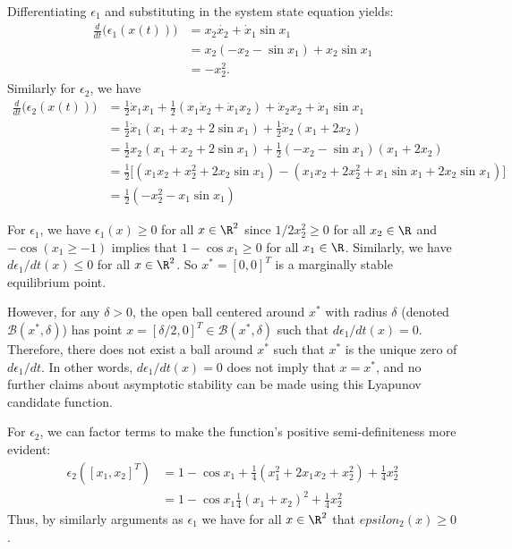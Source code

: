 \documentclass{homework}
\begin{document}
\begin{letterenum}
\item 
Differentiating $\epsilon_1$ and substituting in the system state equation yields:
\begin{align*}
    \frac{d}{dt} \biggl(\epsilon_1(x(t))\biggr)
        &= x_2 \dot{x_2} + \dot{x}_1 \sin x_1 \\
        &= x_2 ( -x_2 - \sin x_1) + x_2 \sin x_1 \\
        &= -x_2^2.
\end{align*}
Similarly for $\epsilon_2$, we have
\begin{align*}
    \frac{d}{dt} \biggl(\epsilon_2(x(t))\biggr)
        &= \frac{1}{2} \dot{x}_1 x_1 + \frac{1}{2} (x_1 \dot{x}_2 + \dot{x}_1 x_2)
            + \dot{x}_2 x_2 + \dot{x}_1 \sin x_1 \\
        &= \frac{1}{2} \dot{x}_1 (x_1 + x_2 + 2 \sin x_1)
            + \frac{1}{2} \dot{x}_2 ( x_1 + 2x_2) \\
        &= \frac{1}{2} x_2 (x_1 + x_2 + 2 \sin x_1)
            + \frac{1}{2} (-x_2 - \sin x_1) ( x_1 + 2x_2) \\
        &= \frac{1}{2} \biggl[
            (x_1 x_2 + x_2^2 + 2x_2 \sin x_1) -
                (x_1 x_2 + 2 x_2^2 + x_1 \sin x_1 + 2 x_2 \sin x_1)
        \biggr] \\
        &= \frac{1}{2} ( - x_2^2 - x_1\sin x_1)
\end{align*}

\item For $\epsilon_1$, we have $\epsilon_1(x) \geq 0$ for all $x\in\R^2$ since
$1/2 x_2^2 \geq 0$ for all $x_2\in \R$ and $-\cos(x_1 \geq -1)$ implies that
$1 - \cos x_1 \geq 0$ for all $x_1 \in \R$. Similarly, we have
$d\epsilon_1/dt(x) \leq 0$ for all $x \in \R^2$. So $x^* = [0, 0]^T$ is a
marginally stable equilibrium point.

However, for any $\delta > 0$, the open ball centered around $x^*$ with radius
$\delta$ (denoted $\mathcal{B}(x^*, \delta)$) has point
$x=[\delta/2, 0]^T \in \mathcal{B}(x^*, \delta)$ such that
$d\epsilon_1/dt(x) = 0$. Therefore, there does not exist a ball around $x^*$ such
that $x^*$ is the unique zero of $d\epsilon_1/dt$. In other words,
$d\epsilon_1/dt(x) = 0$ does not imply that $x = x^*$, and no further
claims about asymptotic stability can be made using this Lyapunov candidate
function.

For $\epsilon_2$, we can factor terms to make the function's positive
semi-definiteness more evident:
\begin{align*}
    \epsilon_2([x_1, x_2]^T) &= 1 - \cos x_1 + \frac{1}{4} ( x_1^2 + 2 x_1x_2 + x_2^2)
        + \frac{1}{4} x_2^2 \\
        &= 1 - \cos x_1 \frac{1}{4} (x_1 + x_2)^2 + \frac{1}{4} x_2^2
\end{align*}
Thus, by similarly arguments as $\epsilon_1$ we have for all $x\in\R^2$
that $epsilon_2(x) \geq 0$.


\end{letterenum}
\end{document}

